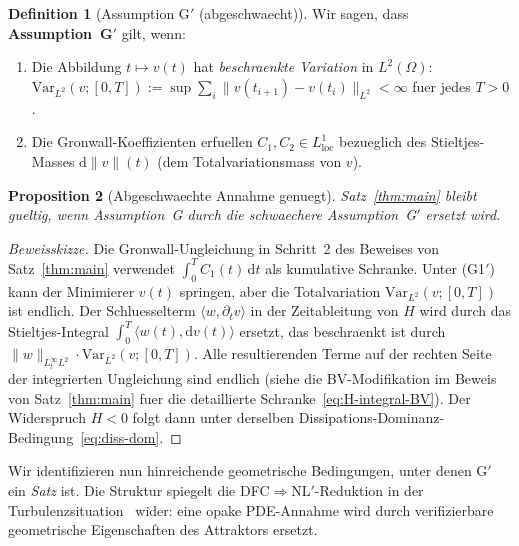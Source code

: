\documentclass[12pt,a4paper]{article}
\theoremstyle{definition}
\newtheorem{definition}{Definition}[section]
\theoremstyle{plain}
\newtheorem{proposition}[definition]{Proposition}
\theoremstyle{remark}
\begin{document}
\begin{definition}[Assumption G$'$ (abgeschwaecht)]\label{ass:Gprime}
Wir sagen, dass \textbf{Assumption~G$'$} gilt, wenn:
\begin{enumerate}
    \item[\emph{(G1$'$)}] Die Abbildung $t \mapsto v(t)$ hat \emph{beschraenkte Variation}
          in $L^2(\Omega)$: $\mathrm{Var}_{L^2}(v; [0,T]) :=
          \sup \sum_{i} \|v(t_{i+1}) - v(t_i)\|_{L^2} < \infty$ fuer jedes
          $T > 0$.
    \item[\emph{(G2$'$)}] Die Gronwall-Koeffizienten erfuellen
          $C_1, C_2 \in L^1_{\mathrm{loc}}$ bezueglich des Stieltjes-Masses
          $\mathrm{d}\|v\|(t)$ (dem Totalvariationsmass von $v$).
\end{enumerate}
\end{definition}

\begin{proposition}[Abgeschwaechte Annahme genuegt]\label{prop:Gprime}
Satz~\ref{thm:main} bleibt gueltig, wenn Assumption~G durch die
schwaechere Assumption~G$'$ ersetzt wird.
\end{proposition}

\begin{proof}[Beweisskizze]
Die Gronwall-Ungleichung in Schritt~2 des Beweises von
Satz~\ref{thm:main} verwendet $\int_0^T C_1(t)\,\mathrm{d} t$ als kumulative
Schranke. Unter (G1$'$) kann der Minimierer $v(t)$ springen, aber die Totalvariation $\mathrm{Var}_{L^2}(v;[0,T])$ ist endlich. Der Schluesselterm
$\langle w, \partial_t v \rangle$ in der Zeitableitung von $H$ wird
durch das Stieltjes-Integral $\int_0^T \langle w(t),
\mathrm{d} v(t)\rangle$ ersetzt, das beschraenkt ist durch $\|w\|_{L^\infty_t L^2}\cdot
\mathrm{Var}_{L^2}(v;[0,T])$. Alle resultierenden Terme auf der rechten Seite
der integrierten Ungleichung sind endlich (siehe die BV-Modifikation
im Beweis von Satz~\ref{thm:main} fuer die detaillierte
Schranke~\eqref{eq:H-integral-BV}). Der Widerspruch $H < 0$ folgt
dann unter derselben Dissipations-Dominanz-Bedingung~\eqref{eq:diss-dom}.
\end{proof}

Wir identifizieren nun hinreichende geometrische Bedingungen, unter denen G$'$ ein
\emph{Satz} ist. Die Struktur spiegelt die DFC$\Rightarrow$NL$'$-Reduktion
in der Turbulenzsituation~\cite{FST-TU2026} wider: eine opake PDE-Annahme wird
durch verifizierbare geometrische Eigenschaften des Attraktors ersetzt.
\end{document}
